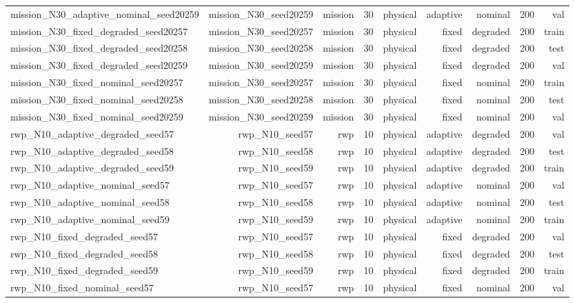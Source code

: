 \begin{tabular}{lrrrrrrrr}
mission\_N30\_adaptive\_nominal\_seed20259 & mission\_N30\_seed20259 & mission & 30 & physical & adaptive & nominal & 200 & val \\
mission\_N30\_fixed\_degraded\_seed20257 & mission\_N30\_seed20257 & mission & 30 & physical & fixed & degraded & 200 & train \\
mission\_N30\_fixed\_degraded\_seed20258 & mission\_N30\_seed20258 & mission & 30 & physical & fixed & degraded & 200 & test \\
mission\_N30\_fixed\_degraded\_seed20259 & mission\_N30\_seed20259 & mission & 30 & physical & fixed & degraded & 200 & val \\
mission\_N30\_fixed\_nominal\_seed20257 & mission\_N30\_seed20257 & mission & 30 & physical & fixed & nominal & 200 & train \\
mission\_N30\_fixed\_nominal\_seed20258 & mission\_N30\_seed20258 & mission & 30 & physical & fixed & nominal & 200 & test \\
mission\_N30\_fixed\_nominal\_seed20259 & mission\_N30\_seed20259 & mission & 30 & physical & fixed & nominal & 200 & val \\
rwp\_N10\_adaptive\_degraded\_seed57 & rwp\_N10\_seed57 & rwp & 10 & physical & adaptive & degraded & 200 & val \\
rwp\_N10\_adaptive\_degraded\_seed58 & rwp\_N10\_seed58 & rwp & 10 & physical & adaptive & degraded & 200 & test \\
rwp\_N10\_adaptive\_degraded\_seed59 & rwp\_N10\_seed59 & rwp & 10 & physical & adaptive & degraded & 200 & train \\
rwp\_N10\_adaptive\_nominal\_seed57 & rwp\_N10\_seed57 & rwp & 10 & physical & adaptive & nominal & 200 & val \\
rwp\_N10\_adaptive\_nominal\_seed58 & rwp\_N10\_seed58 & rwp & 10 & physical & adaptive & nominal & 200 & test \\
rwp\_N10\_adaptive\_nominal\_seed59 & rwp\_N10\_seed59 & rwp & 10 & physical & adaptive & nominal & 200 & train \\
rwp\_N10\_fixed\_degraded\_seed57 & rwp\_N10\_seed57 & rwp & 10 & physical & fixed & degraded & 200 & val \\
rwp\_N10\_fixed\_degraded\_seed58 & rwp\_N10\_seed58 & rwp & 10 & physical & fixed & degraded & 200 & test \\
rwp\_N10\_fixed\_degraded\_seed59 & rwp\_N10\_seed59 & rwp & 10 & physical & fixed & degraded & 200 & train \\
rwp\_N10\_fixed\_nominal\_seed57 & rwp\_N10\_seed57 & rwp & 10 & physical & fixed & nominal & 200 & val \\

\end{tabular}
